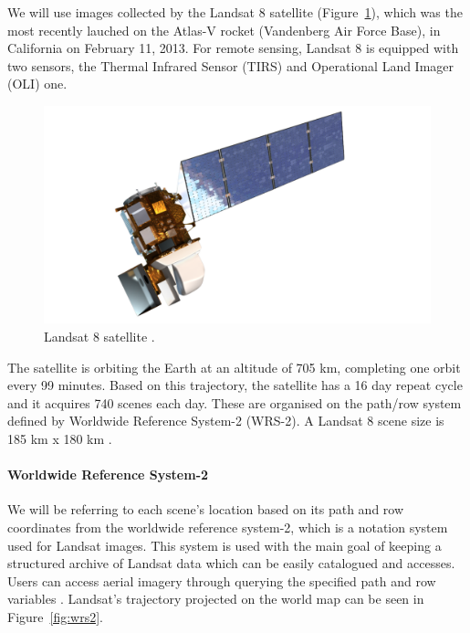 \documentclass[12pt, a4paper]{report}
\begin{document}
	\par We will use images collected by the Landsat 8 satellite (Figure~\ref{fig:landsat_satellite}), which was the most recently lauched on the Atlas-V rocket (Vandenberg Air Force Base), in California on February 11, 2013. For remote sensing, Landsat 8 is equipped with two sensors, the Thermal Infrared Sensor (TIRS)  and Operational Land Imager (OLI) one.
	\begin{figure}[h!]
		\centering
		\includegraphics[scale=0.25]{../images/LandsatSatellite.png}
		\caption{Landsat 8 satellite \cite{LANDSATPIC}.}
		\label{fig:landsat_satellite}
	\end{figure}

	\par The satellite is orbiting the Earth at an altitude of 705 km, completing one orbit every 99 minutes. Based on this trajectory, the satellite has a 16 day repeat cycle and it acquires 740 scenes each day. These are organised on the path/row system defined by Worldwide Reference System-2 (WRS-2). A Landsat 8 scene size is 185 km x 180 km \cite{LANDSAT}. 
	
	\paragraph{Worldwide Reference System-2}
	\label{par:wrs2}
	
	\par We will be referring to each scene's location based on its path and row coordinates from the worldwide reference system-2, which is a notation system used for Landsat images. This system is used with the main goal of keeping a structured archive of Landsat data which can be easily catalogued and accesses. Users can access aerial imagery through querying the specified path and row variables \cite{wrs}. Landsat's trajectory projected on the world map can be seen in Figure~\ref{fig:wrs2}.
\end{document}
